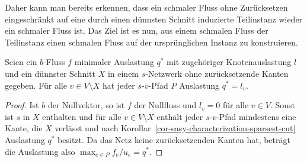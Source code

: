 Daher kann man bereits erkennen, dass ein schmaler Fluss ohne Zurücksetzen eingeschränkt auf eine durch einen dünnsten Schnitt induzierte Teilinstanz wieder ein schmaler Fluss ist.
Das Ziel ist es nun, aus einem schmalen Fluss der Teilinstanz einen schmalen Fluss auf der ursprünglichen Instanz zu konstruieren.

\begin{lemma}\label{lemma-flow-minimal-congestion-sparsest-cut-then-outside-X-congestion-q}
	Seien ein $b$-Fluss $f$ minimaler Auslastung $q^*$ mit zugehöriger Knotenauslastung $l$ und ein dünnster Schnitt $X$ in einem $s$-Netzwerk ohne zurücksetzende Kanten gegeben.
	Für alle $v\in V\setminus X$ hat jeder $s$-$v$-Pfad $P$ Auslastung $q^*=l_v$.
\end{lemma}
\begin{proof}
	Ist $b$ der Nullvektor, so ist $f$ der Nullfluss und $l_v = 0$ für alle $v\in V$.
	Sonst ist $s$ in $X$ enthalten und für alle $v\in V\setminus X$ enthält jeder $s$-$v$-Pfad mindestens eine Kante, die $X$ verlässt und nach Korollar~\ref{cor-easy-characterization-sparsest-cut} Auslastung $q^*$ besitzt.
	Da das Netz keine zurücksetzenden Kanten hat, beträgt die Auslastung also $\max_{e\in P} f_e / u_e = q^*$.
\end{proof}

